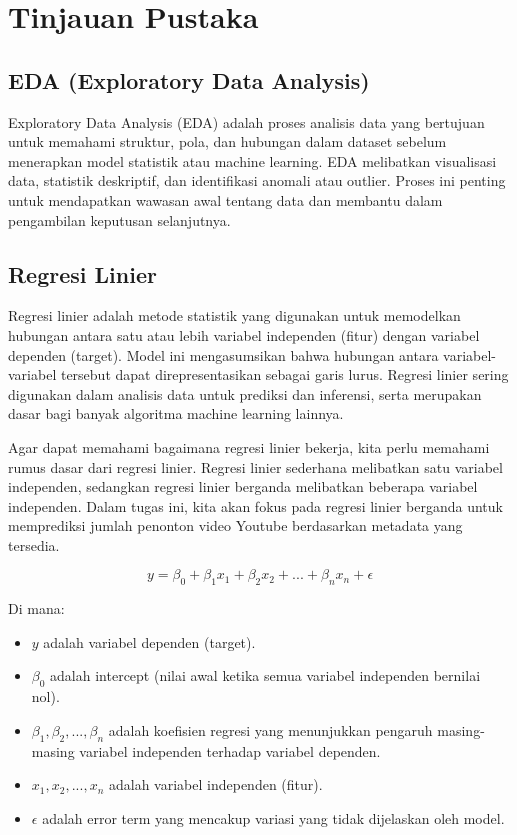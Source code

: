 \newpage

\section{Tinjauan Pustaka}

\subsection{EDA (Exploratory Data Analysis)}
Exploratory Data Analysis (EDA) adalah proses analisis data yang bertujuan untuk memahami struktur, pola, dan hubungan dalam dataset sebelum menerapkan model statistik atau machine learning. EDA melibatkan visualisasi data, statistik deskriptif, dan identifikasi anomali atau outlier. Proses ini penting untuk mendapatkan wawasan awal tentang data dan membantu dalam pengambilan keputusan selanjutnya.

\subsection{Regresi Linier}
Regresi linier adalah metode statistik yang digunakan untuk memodelkan hubungan antara satu atau lebih variabel independen (fitur) dengan variabel dependen (target). Model ini mengasumsikan bahwa hubungan antara variabel-variabel tersebut dapat direpresentasikan sebagai garis lurus. Regresi linier sering digunakan dalam analisis data untuk prediksi dan inferensi, serta merupakan dasar bagi banyak algoritma machine learning lainnya.

Agar dapat memahami bagaimana regresi linier bekerja, kita perlu memahami rumus dasar dari regresi linier. Regresi linier sederhana melibatkan satu variabel independen, sedangkan regresi linier berganda melibatkan beberapa variabel independen. Dalam tugas ini, kita akan fokus pada regresi linier berganda untuk memprediksi jumlah penonton video Youtube berdasarkan metadata yang tersedia.

\begin{equation}
    y = \beta_0 + \beta_1 x_1 + \beta_2 x_2 + ... + \beta_n x_n + \epsilon
\end{equation}

Di mana:
\begin{itemize}
    \item $y$ adalah variabel dependen (target).
    \item $\beta_0$ adalah intercept (nilai awal ketika semua variabel independen bernilai nol).
    \item $\beta_1, \beta_2, ..., \beta_n$ adalah koefisien regresi yang menunjukkan pengaruh masing-masing variabel independen terhadap variabel dependen.
    \item $x_1, x_2, ..., x_n$ adalah variabel independen (fitur).
    \item $\epsilon$ adalah error term yang mencakup variasi yang tidak dijelaskan oleh model.
\end{itemize}


